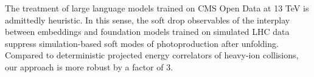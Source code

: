 The treatment of large language models trained on CMS Open Data at 13
TeV is admittedly heuristic. In this sense, the soft drop observables of
the interplay between embeddings and foundation models trained on
simulated LHC data suppress simulation-based soft modes of
photoproduction after unfolding. Compared to deterministic projected
energy correlators of heavy-ion collisions, our approach is more robust
by a factor of 3.

